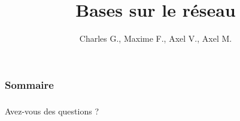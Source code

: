 \documentclass{beamer}
\title{Bases sur le réseau}
\author{Charles G., Maxime F., Axel V., Axel M.}
\begin{document}
\begin{frame}\frametitle{}
    \maketitle
\end{frame}


\begin{frame}\frametitle{Sommaire}
    \tableofcontents
\end{frame}











\begin{frame}\frametitle{}
    {\Huge Avez-vous des questions ?}
\end{frame}
\end{document}
